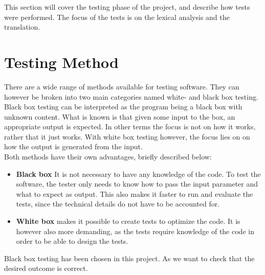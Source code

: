 This section will cover the testing phase of the project, and describe how tests were performed. The focus of the tests is on the lexical analysis and the translation.

\section{Testing Method}
There are a wide range of methods available for testing software. They can however be broken into two main categories named white- and black box testing. Black box testing can be interpreted as the program being a black box with unknown content. What is known is that given some input to the box, an appropriate output is expected. In other terms the focus is not on how it works, rather that it just works. With white box testing however, the focus lies on on how the output is generated from the input.\\

Both methods have their own advantages, briefly described below:
\begin{itemize}
\item[] \textbf{Black box} It is not necessary to have any knowledge of the code. To test the software, the tester only needs to know how to pass the input parameter and what to expect as output. This also makes it faster to run and evaluate the tests, since the technical details do not have to be accounted for.
\item[] \textbf{White box} makes it possible to create tests to optimize the code. It is however also more demanding, as the tests require knowledge of the code in order to be able to design the tests. 
\end{itemize}
Black box testing has been chosen in this project. As we want to check that the desired outcome is correct.

